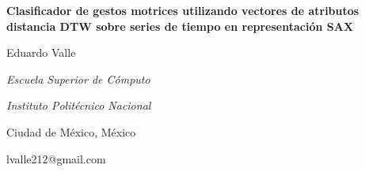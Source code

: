 \begin{center}
	\vspace*{2.3cm}
	
	{\LARGE \textbf{Clasificador de gestos motrices utilizando vectores de atributos distancia DTW sobre series de tiempo en representación SAX}}
	
	\vspace{0.5cm}
	
	{\large Eduardo Valle}
	
	\vspace{0.1cm}
	
	{\large \textit{Escuela Superior de Cómputo}}
	
	\vspace{0.1cm}
	
	{\large \textit{Instituto Politécnico Nacional}}
	
	\vspace{0.1cm}
	
	{\large Ciudad de México, México}
	
	\vspace{0.1cm}
	
	{\large lvalle212@gmail.com}
	
\end{center}